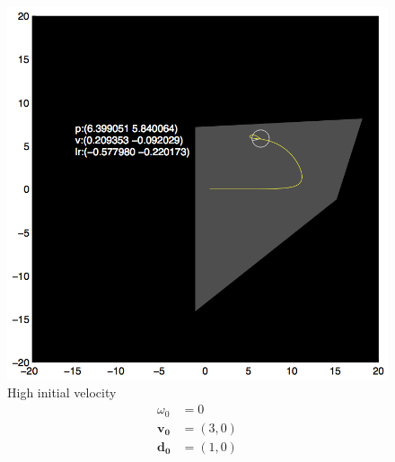 \documentclass{report}
\begin{document}
\begin{figure}
\begin{minipage}{\linewidth}
\begin{minipage}[t]{0.45\linewidth}
    \includegraphics[width=\linewidth]{fig2.png}
    \captionsetup{singlelinecheck=off}
    \caption[.]{\label{fig:fig2}High initial velocity \begin{align*}
    \omega_0 &= 0 \\
    \mathbf{v_0} &= (3, 0)\\
    \mathbf{d_0} &= (1, 0)
    \end{align*}
    }\end{minipage}
\begin{minipage}[t]{0.45\linewidth}
    \centering
    

\end{minipage}
\end{minipage}
\end{figure}
\end{document}
